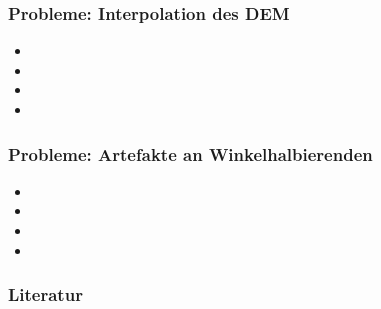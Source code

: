 \documentclass{beamer}
\begin{document}
\begin{frame}
  \frametitle{Probleme: Interpolation des DEM~\cite{fisher1993algorithm}}
  \begin{itemize}[<+->]
    \item 
    \item 
    \item 
    \item 
  \end{itemize}
\end{frame}

\begin{frame}
  \frametitle{Probleme: Artefakte an Winkelhalbierenden}
  \begin{itemize}[<+->]
    \item 
    \item 
    \item 
    \item 
  \end{itemize}
\end{frame}

\begin{frame}%
  \frametitle{Literatur}
  
  \small
\end{frame}
\end{document}
